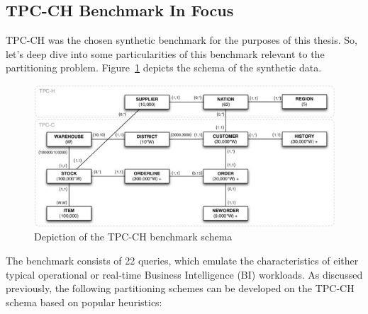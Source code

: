 \subsection{TPC-CH Benchmark In Focus}
\label{sec:tpcch}
TPC-CH was the chosen synthetic benchmark for the purposes of this thesis. So, let's deep dive into some particularities of this benchmark relevant to the partitioning problem. Figure~\ref{fig:tpc-ch-benchmark} depicts the schema of the synthetic data.

\begin{figure}[h]
  \centering
  \includegraphics[width=\linewidth]{figures/ch-benchmark-schema.jpg}
  \caption{Depiction of the TPC-CH benchmark schema \cite{tpc-ch-schema}}
  \label{fig:tpc-ch-benchmark}
\end{figure}

The benchmark consists of 22 queries, which emulate the characteristics of either typical operational or real-time Business Intelligence (BI) workloads. As discussed previously, the following partitioning schemes can be developed on the TPC-CH schema based on popular heuristics:

